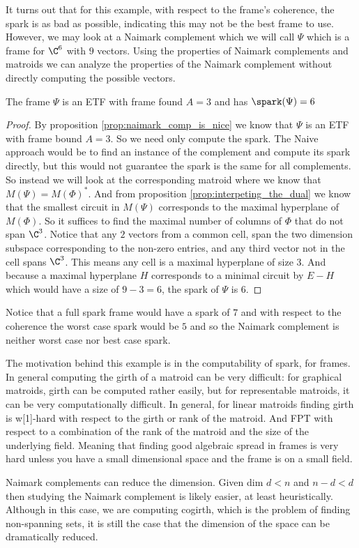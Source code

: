 It turns out that for this example, with respect to the frame's coherence, the spark is as bad as possible, indicating this may not be the best frame to use. However, we may look at a Naimark complement which we will call $\Psi$ which is a frame for $\C^6$ with $9$ vectors. Using the properties of Naimark complements and matroids we can analyze the properties of the Naimark complement without directly computing the possible vectors.

\begin{example}
    The frame $\Psi$ is an ETF with frame found $A=3$ and has $\spark(\Psi)=6$
\end{example}
\begin{proof}
    By proposition \ref{prop:naimark_comp_is_nice} we know that $\Psi$ is an ETF with frame bound $A=3$. So we need only compute the spark. The Naive approach would be to find an instance of the complement and compute its spark directly, but this would not guarantee the spark is the same for all complements. So instead we will look at the corresponding matroid where we know that $M(\Psi)=M(\Phi)^*$. And from proposition \ref{prop:interpeting_the_dual} we know that the smallest circuit in $M(\Psi)$ corresponds to the maximal hyperplane of $M(\Phi)$. So it suffices to find the maximal number of columns of $\Phi$ that do not span $\C^3$. Notice that any $2$ vectors from a common cell, span the two dimension subspace corresponding to the non-zero entries, and any third vector not in the cell spans $\C^3$. This means any cell is a maximal hyperplane of size $3$. And because a maximal hyperplane $H$ corresponds to a minimal circuit by $E-H$ which would have a size of $9-3=6$, the spark of $\Psi$ is $6$.
\end{proof}

 Notice that a full spark frame would have a spark of $7$ and with respect to the coherence the worst case spark would be $5$ and so the Naimark complement is neither worst case nor best case spark.

The motivation behind this example is in the computability of spark, for frames. In general computing the girth of a matroid can be very difficult: for graphical matroids, girth can be computed rather easily, but for representable matroids, it can be very computationally difficult.
In general, for linear matroids finding girth is w[1]-hard with respect to the girth or rank of the matroid. And FPT with respect to a combination of the rank of the matroid and the size of the underlying field. Meaning that finding good algebraic spread in frames is very hard unless you have a small dimensional space and the frame is on a small field.

Naimark complements can reduce the dimension. Given dim $d<n$ and $n-d<d$ then studying the Naimark complement is likely easier, at least heuristically. Although in this case, we are computing cogirth, which is the problem of finding non-spanning sets, it is still the case that the dimension of the space can be dramatically reduced.